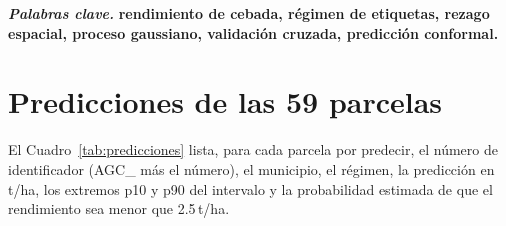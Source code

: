 \documentclass[conference,letterpaper]{IEEEtran}
\begin{document}
\smallskip
\noindent\textbf{\textit{Palabras clave.}} \bfseries rendimiento de cebada, régimen de etiquetas, rezago espacial,
proceso gaussiano, validación cruzada, predicción conformal.\par\mdseries










\appendices
\section{Predicciones de las 59 parcelas}\label{sec:apendice}

El Cuadro~\ref{tab:predicciones} lista, para cada parcela por predecir, el número de identificador (AGC\_ más el
número), el municipio, el régimen, la predicción en t/ha, los extremos p10 y p90 del intervalo y la probabilidad
estimada de que el rendimiento sea menor que 2.5\,t/ha.
\end{document}
